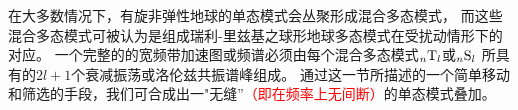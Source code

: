 {{{%

在大多数情况下，有旋非弹性地球的单态模式会丛聚形成混合多态模式，
而这些混合多态模式可被认为是组成瑞利-里兹基之球形地球多态模式在受扰动情形下的对应。
一个完整的的宽频带加速图或频谱必须由每个混合多态模式${}_n{\rm T}_l$或${}_n{\rm S}_l$
所具有的$2l+1$个衰减振荡或洛伦兹共振谱峰组成。
通过这一节所描述的一个简单移动和筛选的手段，我们可合成出一"无缝”\textcolor{red}{（即在频率上无间断）}的单态模式叠加。

}}}
